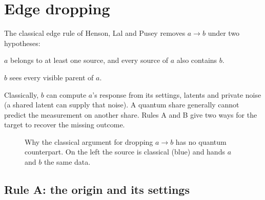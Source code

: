 \section{Edge dropping}\label{sec:edge}
The classical edge rule of Henson, Lal and Pusey \cite{HLP,Evans,AWS} removes $a\to b$ under two hypotheses:
\begin{description}[leftmargin=1.2cm]
\item[(H1)] $a$ belongs to at least one source, and every source of $a$ also contains $b$.
\item[(H2)] $b$ sees every visible parent of $a$.
\end{description}
Classically, $b$ can compute $a$'s response from its settings, latents and private noise (a shared
latent can supply that noise). A quantum share generally cannot predict the measurement on another
share. Rules A and B give two ways for the target to recover the missing outcome.

\begin{figure}[H]
\centering
{}
\caption{Why the classical argument for dropping $a\to b$ has no quantum counterpart. On the left the source is
classical (blue) and hands $a$ and $b$ the same data.}
\label{fig:edge-idea}
\end{figure}

\subsection{Rule A: the origin and its settings}

